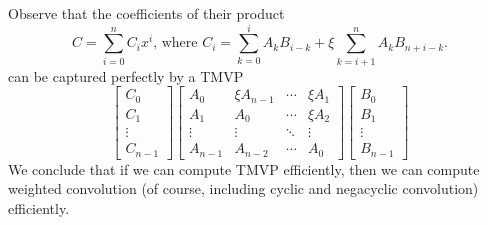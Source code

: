 \documentclass[
11pt,notheorems,hyperref={pdfauthor=whatever}
]{beamer}
\begin{document}
\begin{frame}
    Observe that the coefficients of their product
    \[
        C = \sum_{i=0}^{n} C_{i} x^{i}\text{, where }C_{i} = \sum_{k=0}^{i} A_{k}B_{i-k} + \xi\sum_{k=i+1}^{n} A_{k}B_{n+i-k}.
    \]
    can be captured perfectly by a TMVP
    \[
    \begin{bmatrix}
        C_{0} \\ C_{1} \\ \vdots \\ C_{n-1}
    \end{bmatrix}
    \begin{bmatrix}
        A_{0} & \xi A_{n-1} &\cdots & \xi A_{1} \\
        A_{1} & A_{0} &\cdots & \xi A_{2}\\
        \vdots &\vdots & \ddots & \vdots \\
        A_{n-1} & A_{n-2} & \cdots & A_{0}
    \end{bmatrix}
    \begin{bmatrix}
        B_{0} \\ B_{1} \\ \vdots \\ B_{n-1}
    \end{bmatrix}
    \]
    We conclude that if we can compute TMVP efficiently, then we can compute weighted convolution (of course, including cyclic and negacyclic convolution) efficiently.
\end{frame}
\end{document}
